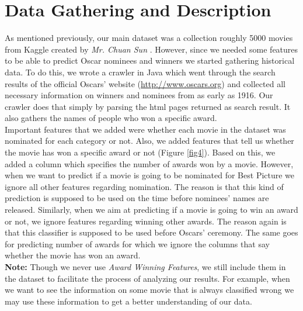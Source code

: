 \documentclass[journal,transmag]{IEEEtran}
\begin{document}
	
	\section{Data Gathering and Description}
As mentioned previously, our main dataset was a collection roughly 5000 movies from Kaggle created by \emph{Mr. Chuan Sun} \cite{refCreator}. However, since we needed some features to be able to predict Oscar nominees and winners we started gathering historical data. To do this, we wrote a crawler in Java which went through the search results of the official Oscars' website (\url{http://www.oscars.org}) and collected all necessary information on winners and nominees from as early as 1916. Our crawler does that simply by parsing the html pages returned as search result. It also gathers the names of people who won a specific award.\\
Important features that we added were whether each movie in the dataset was nominated for each category or not. Also, we added features that tell us whether the movie has won a specific award or not (Figure \ref{fig4}). Based on this, we added a column which specifies the number of awards won by a movie. However, when we want to predict if a movie is going to be nominated for Best Picture we ignore all other features regarding nomination. The reason is that this kind of prediction is supposed to be used on the time before nominees' names are released. Similarly, when we aim at predicting if a movie is going to win an award or not, we ignore features regarding winning other awards. The reason again is that this classifier is supposed to be used before Oscars' ceremony. The same goes for predicting number of awards for which we ignore the columns that say whether the movie has won an award.\\
\textbf{Note:} Though we never use \emph{Award Winning Features}, we still include them in the dataset to facilitate the process of analyzing our results. For example, when we want to see the information on some movie that is always classified wrong we may use these information to get a better understanding of our data.\\
\end{document}
